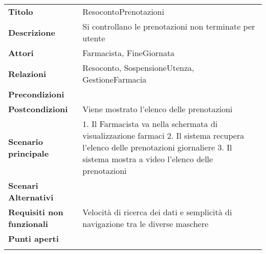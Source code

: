 \begin{longtable}[c]{@{}ll@{}}
\toprule\addlinespace
\textbf{Titolo} & ResocontoPrenotazioni
\\\addlinespace
\textbf{Descrizione} & Si controllano le prenotazioni non terminate per
utente
\\\addlinespace
\textbf{Attori} & Farmacista, FineGiornata
\\\addlinespace
\textbf{Relazioni} & Resoconto, SospensioneUtenza, GestioneFarmacia
\\\addlinespace
\textbf{Precondizioni} &
\\\addlinespace
\textbf{Postcondizioni} & Viene mostrato l'elenco delle prenotazioni
\\\addlinespace
\textbf{Scenario principale} & 1. Il Farmacista va nella schermata di
visualizzazione farmaci 2. Il sistema recupera l'elenco delle
prenotazioni giornaliere 3. Il sistema mostra a video l'elenco delle
prenotazioni
\\\addlinespace
\textbf{Scenari Alternativi} &
\\\addlinespace
\textbf{Requisiti non funzionali} & Velocità di ricerca dei dati e
semplicità di navigazione tra le diverse maschere
\\\addlinespace
\textbf{Punti aperti} &
\\\addlinespace
\bottomrule
\end{longtable}

